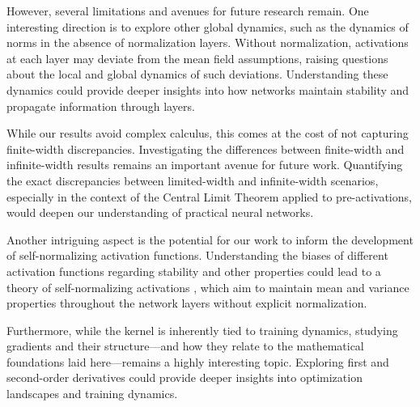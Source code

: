\documentclass[twoside]{article}
\theoremstyle{definition}
\begin{document}

However, several limitations and avenues for future research remain. One interesting direction is to explore other global dynamics, such as the dynamics of norms in the absence of normalization layers. Without normalization, activations at each layer may deviate from the mean field assumptions, raising questions about the local and global dynamics of such deviations. Understanding these dynamics could provide deeper insights into how networks maintain stability and propagate information through layers.

While our results avoid complex calculus, this comes at the cost of not capturing finite-width discrepancies. Investigating the differences between finite-width and infinite-width results remains an important avenue for future work. Quantifying the exact discrepancies between limited-width and infinite-width scenarios, especially in the context of the Central Limit Theorem applied to pre-activations, would deepen our understanding of practical neural networks.

Another intriguing aspect is the potential for our work to inform the development of self-normalizing activation functions. Understanding the biases of different activation functions regarding stability and other properties could lead to a theory of self-normalizing activations \citep{klambauer2017self}, which aim to maintain mean and variance properties throughout the network layers without explicit normalization.

Furthermore, while the kernel is inherently tied to training dynamics, studying gradients and their structure—and how they relate to the mathematical foundations laid here—remains a highly interesting topic. Exploring first and second-order derivatives could provide deeper insights into optimization landscapes and training dynamics.
\end{document}
